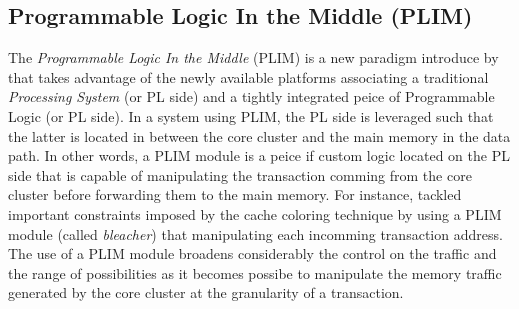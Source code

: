     \subsection{Programmable Logic In the Middle (PLIM)}
        The \emph{Programmable Logic In the Middle} (PLIM) is a new paradigm introduce by \cite{PLIM20} that takes advantage of the newly available platforms associating a traditional \emph{Processing System} (or PL side) and a tightly integrated peice of Programmable Logic (or PL side).
        In a system using PLIM, the PL side is leveraged such that the latter is located in between the core cluster and the main memory in the data path.
        In other words, a PLIM module is a peice if custom logic located on the PL side that is capable of manipulating the transaction comming from the core cluster before forwarding them to the main memory.
        For instance, \cite{PLIM20} tackled important constraints imposed by the cache coloring technique by using a PLIM module (called \emph{bleacher}) that manipulating each incomming transaction address.
        The use of a PLIM module broadens considerably the control on the traffic and the range of possibilities as it becomes possibe to manipulate the memory traffic generated by the core cluster at the granularity of a transaction.
